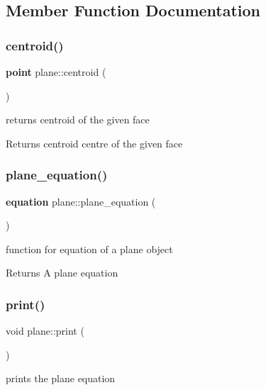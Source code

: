\subsection{Member Function Documentation}
\mbox{\label{classplane_a4fb4c504e6115d98fa4c9ba0f77ba459}} 
\subsubsection{centroid()}
{\footnotesize\ttfamily \textbf{ point} plane\+::centroid (\begin{DoxyParamCaption}{ }\end{DoxyParamCaption})\hspace{0.3cm}{\ttfamily [inline]}}

returns centroid of the given face \begin{DoxyReturn}{Returns}
centroid centre of the given face 
\end{DoxyReturn}
\mbox{\label{classplane_a883f37fac4157508b260b5c4cd2824e2}} 
\subsubsection{plane\+\_\+equation()}
{\footnotesize\ttfamily \textbf{ equation} plane\+::plane\+\_\+equation (\begin{DoxyParamCaption}{ }\end{DoxyParamCaption})\hspace{0.3cm}{\ttfamily [inline]}}

function for equation of a plane object \begin{DoxyReturn}{Returns}
A plane equation 
\end{DoxyReturn}
\mbox{\label{classplane_ab0cad9494cf257927c1045d77e9f1c24}} 
\subsubsection{print()}
{\footnotesize\ttfamily void plane\+::print (\begin{DoxyParamCaption}{ }\end{DoxyParamCaption})\hspace{0.3cm}{\ttfamily [inline]}}

prints the plane equation 

